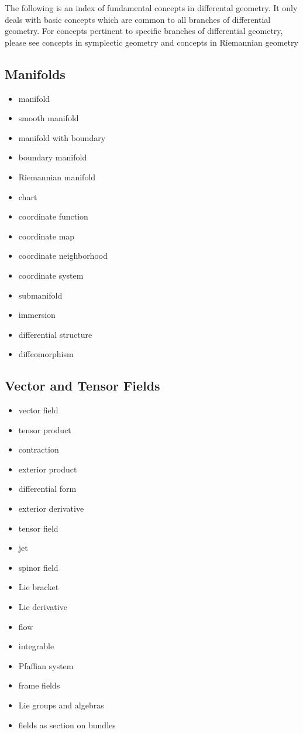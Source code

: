 \documentclass[12pt]{article}
\begin{document}
The following is an index of fundamental concepts in differental geometry.  It only deals with basic concepts which are common to all branches of differential geometry.  For concepts pertinent to specific branches of differential geometry, please see concepts in symplectic geometry and concepts in Riemannian geometry 

\subsection{Manifolds}

\begin{itemize}
\item manifold
\item smooth manifold
\item manifold with boundary
\item boundary manifold
\item Riemannian manifold
\item chart
\item coordinate function
\item coordinate map
\item coordinate neighborhood
\item coordinate system
\item submanifold
\item immersion
\item differential structure
\item diffeomorphism
\end{itemize}

\subsection{Vector and Tensor Fields}
\begin{itemize}
\item vector field
\item tensor product
\item contraction
\item exterior product
\item differential form
\item exterior derivative
\item tensor field
\item jet
\item spinor field
\item Lie bracket
\item Lie derivative
\item flow
\item integrable
\item Pfaffian system
\item frame fields
\item Lie groups and algebras 
\item fields as section on bundles
\end{itemize}
\end{document}
